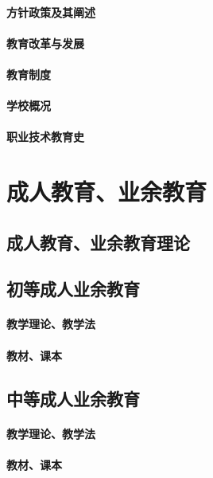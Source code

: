 \documentclass[UTF8]{../../ApplicationUniverse}
\begin{document}
    \subsubsection{方针政策及其阐述}
    \subsubsection{教育改革与发展}
    \subsubsection{教育制度}
    \subsubsection{学校概况}
    \subsubsection{职业技术教育史}





\chapter{成人教育、业余教育}
\section{成人教育、业余教育理论}
\section{初等成人业余教育}
    \subsubsection{教学理论、教学法}
    \subsubsection{教材、课本}
\section{中等成人业余教育}
    \subsubsection{教学理论、教学法}
    \subsubsection{教材、课本}
\end{document}
